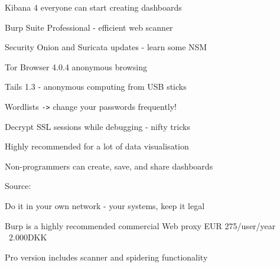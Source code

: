 \documentclass[20pt,landscape,a4paper,footrule]{foils}
\begin{document}



\begin{list1}
\item Kibana 4 everyone can start creating dashboards
\item Burp Suite Professional - efficient web scanner
\item Security Onion and Suricata updates - learn some NSM
\item Tor Browser 4.0.4 anonymous browsing
\item Tails 1.3 - anonymous computing from USB sticks
\item Wordlists \verb+->+ change your passwords frequently!
\item Decrypt SSL sessions while debugging - nifty tricks
\end{list1}





\centerline{Highly recommended for a lot of data visualisation}

Non-programmers can create, save, and share dashboards

Source:








\begin{list1}

\item Do it in your own network - your systems, keep it legal
\item Burp is a highly recommended commercial Web proxy EUR 275/user/year ~2.000DKK
\item Pro version includes scanner and spidering functionality
\end{list1}


\end{document}
